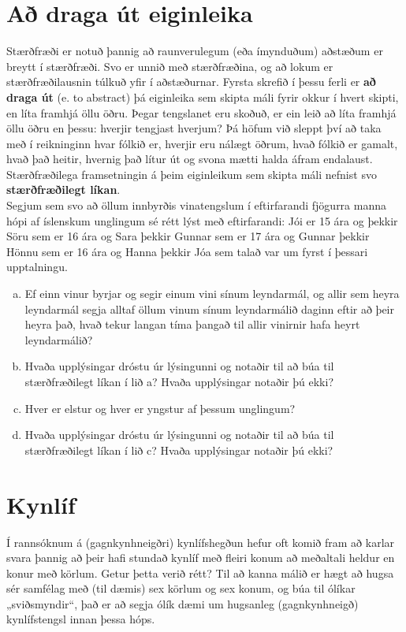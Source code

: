 \documentclass[b5paper,12pt]{book}
\begin{document}
\section{Að draga út eiginleika}
Stærðfræði er notuð þannig að raunverulegum (eða ímynduðum) aðstæðum er breytt í stærðfræði. Svo er unnið með stærðfræðina, og að lokum er stærðfræðilausnin túlkuð yfir í aðstæðurnar. Fyrsta skrefið í þessu ferli er \textbf{að draga út} (e. to abstract) þá eiginleika sem skipta máli fyrir okkur í hvert skipti, en líta framhjá öllu öðru. Þegar tengslanet eru skoðuð, er ein leið að líta framhjá öllu öðru en þessu: hverjir tengjast hverjum? Þá höfum við sleppt því að taka með í reikninginn hvar fólkið er, hverjir eru nálægt öðrum, hvað fólkið er gamalt, hvað það heitir, hvernig það lítur út og svona mætti halda áfram endalaust. Stærðfræðilega framsetningin á þeim eiginleikum sem skipta máli nefnist svo \textbf{stærðfræðilegt líkan}.\\   
Segjum sem svo að öllum innbyrðis vinatengslum í eftirfarandi fjögurra manna hópi af íslenskum unglingum sé rétt lýst með eftirfarandi: Jói er 15 ára og þekkir Söru sem er 16 ára og Sara þekkir Gunnar sem er 17 ára og Gunnar þekkir Hönnu sem er 16 ára og Hanna þekkir Jóa sem talað var um fyrst í þessari upptalningu. 
\begin{enumerate}[(a)]
\item Ef einn vinur byrjar og segir einum vini sínum leyndarmál, og allir sem heyra leyndarmál segja alltaf öllum vinum sínum leyndarmálið daginn eftir að þeir heyra það, hvað tekur langan tíma þangað til allir vinirnir hafa heyrt leyndarmálið? 
\item Hvaða upplýsingar dróstu úr lýsingunni og notaðir til að búa til stærðfræðilegt líkan í lið a? Hvaða upplýsingar notaðir þú ekki?
\item Hver er elstur og hver er yngstur af þessum unglingum? 
\item Hvaða upplýsingar dróstu úr lýsingunni og notaðir til að búa til stærðfræðilegt líkan í lið c? Hvaða upplýsingar notaðir þú ekki?
\end{enumerate}

\section{Kynlíf}
\label{sec:gagnkyn}
Í rannsóknum á (gagnkynhneigðri) kynlífshegðun hefur oft komið fram að karlar svara þannig að þeir hafi stundað kynlíf með fleiri konum að meðaltali heldur en konur með körlum. Getur þetta verið rétt? Til að kanna málið er hægt að hugsa sér samfélag með (til dæmis) sex körlum og sex konum, og búa til ólíkar „sviðsmyndir“, það er að segja ólík dæmi um hugsanleg (gagnkynhneigð) kynlífstengsl innan þessa hóps. 
\end{document}
